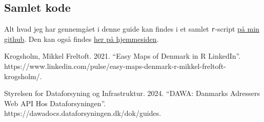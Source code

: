\documentclass[
  a4paper,
  DIV=11,
  numbers=noendperiod,
  oneside]{scrartcl}
\newlength{\cslhangindent}
\newenvironment{CSLReferences}[2] %
 {\begin{list}{}{%
  \setlength{\itemindent}{0pt}
  \setlength{\leftmargin}{0pt}
  \setlength{\parsep}{0pt}
  \ifodd #1
   \setlength{\leftmargin}{\cslhangindent}
   \setlength{\itemindent}{-1\cslhangindent}
  \fi
  \setlength{\itemsep}{#2\baselineskip}}}
 {\end{list}}
\begin{document}
{
\makeatletter
\def\LT@makecaption#1#2#3{%
  \noalign{\smash{\hbox{\kern\textwidth\rlap{\kern\marginparsep
  \parbox[t]{\marginparwidth}{%
    \footnotesize{%
      \vspace{(1.1\baselineskip)}
    #1{#2: }\ignorespaces #3}}}}}}%
    }
\makeatother

\begin{figure}[H]



\end{figure}%

}

\subsection{Samlet kode}\label{samlet-kode}

Alt hvad jeg har gennemgået i denne guide kan findes i et samlet
\texttt{r}-script
\href{https://github.com/aleksanderbl29/aleksanderbldk/blob/main/guides/2024-06-29-danmarkskort-i-r/kort.r}{på
min github}. Den kan også findes \href{./kort-kode.qmd}{her på
hjemmesiden}.

\label{refs}
\begin{CSLReferences}{1}{0}
Krogsholm, Mikkel Freltoft. 2021. {``Easy Maps of {Denmark} in {R}
{\textbar} {LinkedIn}''}.
https://www.linkedin.com/pulse/easy-maps-denmark-r-mikkel-freltoft-krogsholm/.

Styrelsen for Dataforsyning og Infrastruktur. 2024. {``{DAWA}: {Danmarks
Adressers Web API} Hos {Dataforsyningen}''}.
https://dawadocs.dataforsyningen.dk/dok/guides.

\end{CSLReferences}
\end{document}

